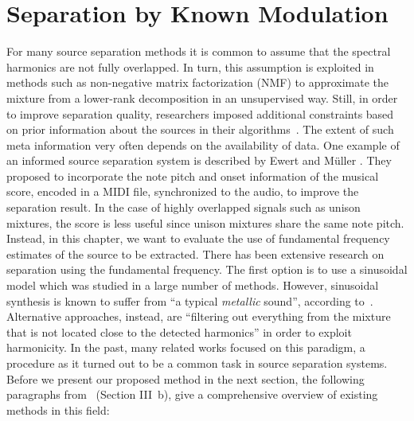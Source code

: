 \chapter{Separation by Known Modulation}
\label{cha:known}

For many source separation methods it is common to assume that the spectral harmonics are not fully overlapped.
In turn, this assumption is exploited in methods such as non-negative matrix factorization (NMF) to approximate the mixture from a lower-rank decomposition in an unsupervised way.
Still, in order to improve separation quality, researchers imposed additional constraints based on prior information about the sources in their algorithms~\cite{ozerov12}.
The extent of such meta information very often depends on the availability of data.
One example of an informed source separation system is described by Ewert and M\"uller \cite{ewert12}.
They proposed to incorporate the note pitch and onset information of the musical score, encoded in a MIDI file, synchronized to the audio, to improve the separation result.
In the case of highly overlapped signals such as unison mixtures, the score is less useful since unison mixtures share the same note pitch.
Instead, in this chapter, we want to evaluate the use of fundamental frequency estimates of the source to be extracted.
There has been extensive research on separation using the fundamental frequency.
The first option is to use a sinusoidal model which was studied in a large number of methods.
However, sinusoidal synthesis is known to suffer from ``a typical \textit{metallic} sound'', according to~\cite{rafii}. 
Alternative approaches, instead, are ``filtering out everything from the mixture that is not located close to the detected harmonics'' in order to exploit harmonicity.
In the past, many related works focused on this paradigm, a procedure as it turned out to be a common task in source separation systems. 
Before we present our proposed method in the next section, the following paragraphs from~\cite{rafii} (Section III~b), give a comprehensive overview of existing methods in this field:

